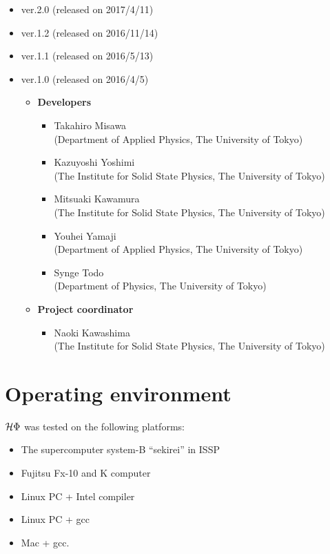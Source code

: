 \begin{itemize}
\item{ver.2.0 (released on 2017/4/11)}
\item{ver.1.2 (released on 2016/11/14)}
\item{ver.1.1 (released on 2016/5/13)}
\item{ver.1.0 (released on 2016/4/5)}
\begin{itemize}
	\item{\bf Developers}
	\begin{itemize}
	\item{Takahiro Misawa \\(Department of Applied Physics, The University of Tokyo)}
	\item{Kazuyoshi Yoshimi\\ (The Institute for Solid State Physics, The University of Tokyo)}
	\item{Mitsuaki Kawamura\\ (The Institute for Solid State Physics, The University of Tokyo)}
	\item{Youhei Yamaji\\ (Department of Applied Physics, The University of Tokyo)}
	\item{Synge Todo\\ (Department of Physics, The University of Tokyo)}
	\end{itemize}
	\item{\bf Project coordinator}
	\begin{itemize}
	\item{Naoki Kawashima\\ (The Institute for Solid State Physics, The University of Tokyo)}
	\end{itemize}
\end{itemize}
\end{itemize}

\section{Operating environment}
 $\mathcal{H} \Phi$ was tested on the following platforms:

\begin{itemize}
\item The supercomputer system-B ``sekirei'' in ISSP
\item Fujitsu Fx-10 and K computer
\item Linux PC + Intel compiler
\item Linux PC + gcc
\item Mac + gcc.
\end{itemize}
